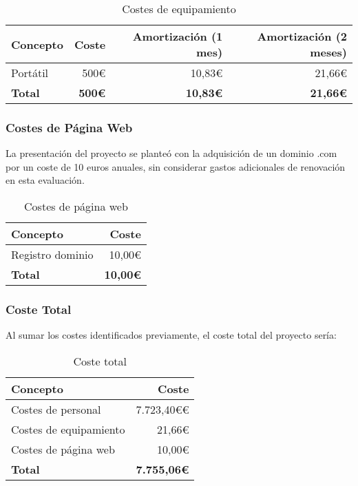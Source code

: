 \begin{table}[h]
\centering
\begin{tabular}{| l | r | r | r |}
\hline
Concepto & Coste & Amortización (1 mes) & Amortización (2 meses) \\ \hline
Portátil & 500€ & 10,83€ & 21,66€ \\ \hline
\textbf{Total} & \textbf{500€} & \textbf{10,83€} & \textbf{21,66€} \\ \hline
\end{tabular}
\caption{Costes de equipamiento}
\end{table}

\subsubsection{Costes de Página Web}
La presentación del proyecto se planteó con la adquisición de un dominio .com por un coste de 10 euros anuales, sin considerar gastos adicionales de renovación en esta evaluación.

\begin{table}[h]
\centering
\begin{tabular}{| l | r |}
\hline
Concepto & Coste \\ \hline
Registro dominio & 10,00€ \\ \hline
\textbf{Total} & \textbf{10,00€} \\ \hline
\end{tabular}
\caption{Costes de página web}
\end{table}

\subsubsection{Coste Total}
Al sumar los costes identificados previamente, el coste total del proyecto sería:

\begin{table}[h]
\centering
\begin{tabular}{| l | r |}
\hline
Concepto & Coste \\ \hline
Costes de personal & 7.723,40€€ \\
Costes de equipamiento & 21,66€ \\
Costes de página web & 10,00€ \\ \hline
\textbf{Total} & \textbf{7.755,06€} \\ \hline
\end{tabular}
\caption{Coste total}
\end{table}

